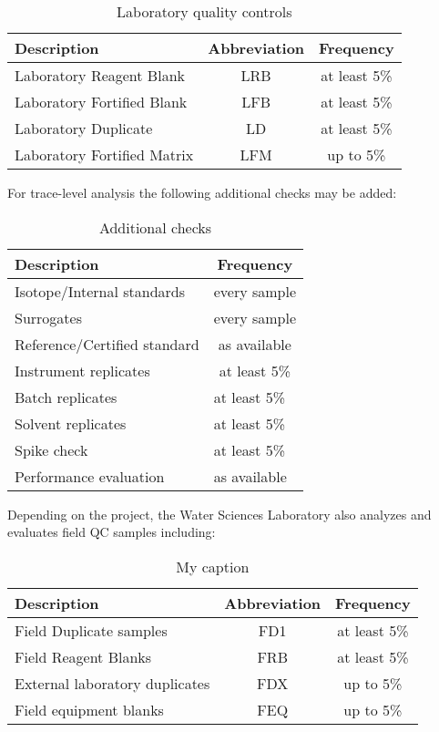 \begin{table}[]
	\centering
	\caption{Laboratory quality controls}
	\begin{tabular}{@{}lcc@{}}
		\toprule
		Description                 & Abbreviation & Frequency    \\ \midrule
		Laboratory Reagent Blank    & LRB          & at least 5\% \\
		Laboratory Fortified Blank  & LFB          & at least 5\% \\
		Laboratory Duplicate        & LD           & at least 5\% \\
		Laboratory Fortified Matrix & LFM          & up to 5\%    \\ \bottomrule
	\end{tabular}
\end{table}

\noindent
For trace-level analysis the following additional checks may be added:


\begin{table}[]
	\centering
	\caption{Additional checks}
	\begin{tabular}{@{}ll@{}}
		\toprule
		Description                  & \multicolumn{1}{c}{Frequency}    \\ \midrule
		Isotope/Internal standards   & \multicolumn{1}{c}{every sample} \\
		Surrogates                   & every sample                     \\
		Reference/Certified standard & \multicolumn{1}{c}{as available} \\
		Instrument replicates        & \multicolumn{1}{c}{at least 5\%} \\
		Batch replicates             & at least 5\%                     \\
		Solvent replicates           & at least 5\%                     \\
		Spike check                  & at least 5\%                     \\
		Performance evaluation       & as available                     \\ \bottomrule
	\end{tabular}
\end{table}

\noindent
Depending on the project, the Water Sciences Laboratory also analyzes 
and evaluates field QC samples including:

\begin{table}[]
	\centering
	\caption{My caption}
	\begin{tabular}{@{}lcc@{}}
		\toprule
		Description                    & Abbreviation & Frequency    \\ \midrule
		Field Duplicate samples        & FD1          & at least 5\% \\
		Field Reagent Blanks           & FRB          & at least 5\% \\
		External laboratory duplicates & FDX          & up to 5\%    \\
		Field equipment blanks         & FEQ          & up to 5\%    \\ \bottomrule
	\end{tabular}
\end{table}


